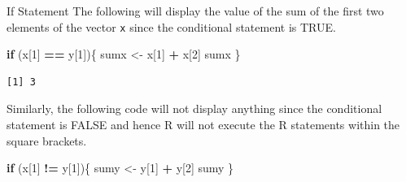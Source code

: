 \documentclass[
  ignorenonframetext,
]{beamer}
\newenvironment{Shaded}{\begin{snugshade}}{\end{snugshade}}
\newcommand{\ControlFlowTok}[1]{\textcolor[rgb]{0.13,0.29,0.53}{\textbf{#1}}}
\newcommand{\DecValTok}[1]{\textcolor[rgb]{0.00,0.00,0.81}{#1}}
\newcommand{\NormalTok}[1]{#1}
\newcommand{\OtherTok}[1]{\textcolor[rgb]{0.56,0.35,0.01}{#1}}
\newcommand{\SpecialCharTok}[1]{\textcolor[rgb]{0.81,0.36,0.00}{\textbf{#1}}}
\begin{document}
\begin{frame}[fragile]{If Statement}
\protect\hypertarget{if-statement}{}
The following will display the value of the sum of the first two
elements of the vector \texttt{x} since the conditional statement is
TRUE.

\small

\begin{Shaded}
\begin{Highlighting}[]
\ControlFlowTok{if}\NormalTok{ (x[}\DecValTok{1}\NormalTok{] }\SpecialCharTok{==}\NormalTok{ y[}\DecValTok{1}\NormalTok{])\{}
\NormalTok{  sumx }\OtherTok{\textless{}{-}}\NormalTok{ x[}\DecValTok{1}\NormalTok{] }\SpecialCharTok{+}\NormalTok{ x[}\DecValTok{2}\NormalTok{]}
\NormalTok{  sumx}
\NormalTok{\}}
\end{Highlighting}
\end{Shaded}

\begin{verbatim}
[1] 3
\end{verbatim}

\normalsize

Similarly, the following code will not display anything since the
conditional statement is FALSE and hence R will not execute the R
statements within the square brackets.

\small

\begin{Shaded}
\begin{Highlighting}[]
\ControlFlowTok{if}\NormalTok{ (x[}\DecValTok{1}\NormalTok{] }\SpecialCharTok{!=}\NormalTok{ y[}\DecValTok{1}\NormalTok{])\{}
\NormalTok{  sumy }\OtherTok{\textless{}{-}}\NormalTok{ y[}\DecValTok{1}\NormalTok{] }\SpecialCharTok{+}\NormalTok{ y[}\DecValTok{2}\NormalTok{]}
\NormalTok{  sumy}
\NormalTok{\}}
\end{Highlighting}
\end{Shaded}

\normalsize
\end{frame}
\end{document}
